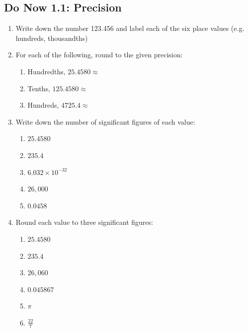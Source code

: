 \documentclass[12pt, oneside]{article}
\begin{document}
\subsection*{Do Now 1.1: Precision}

\begin{enumerate}
  \item Write down the number 123.456 and label each of the six place values (e.g. hundreds, thousandths)\\[2in]
  \item For each of the following, round to the given precision:
  \begin{enumerate}
    \item Hundredths, $25.4580 \approx$\\[0.5in]
    \item Tenths, $125.4580 \approx$\\[0.5in]
    \item Hundreds, $4725.4 \approx$\\[0.5in]
  \end{enumerate}
  \item Write down the number of significant figures of each value:
  \begin{enumerate}
    \item $25.4580$\\[0.4in]
    \item $235.4$\\[0.4in]
    \item $6.032 \times 10^{-32}$\\[0.4in]
    \item $26,000$\\[0.4in]
    \item $0.0458$\\[0.4in]
  \end{enumerate}
  \item Round each value to three significant figures:
  \begin{enumerate}
    \item $25.4580$\\[0.5in]
    \item $235.4$\\[0.5in]
    \item $26,060$\\[0.5in]
    \item $0.045867$\\[0.5in]
    \item $\pi$\\[0.5in]
    \item $\frac{22}{7}$\\[0.5in]
  \end{enumerate}

\end{enumerate}
\end{document}
